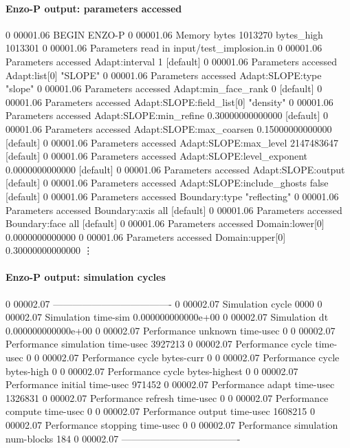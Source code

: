 \begin{frame}[fragile]
\secframetitle{\ssRunning}
\framesubtitle{Enzo-P output: parameters accessed}
\tiny
\begin{semiverbatim}
0 00001.06  BEGIN ENZO-P
0 00001.06 Memory bytes 1013270 bytes_high 1013301
0 00001.06 Parameters read in input/test_implosion.in
0 00001.06 Parameters accessed Adapt:interval 1 [default]
0 00001.06 Parameters accessed Adapt:list[0] "SLOPE"
0 00001.06 Parameters accessed Adapt:SLOPE:type "slope"
0 00001.06 Parameters accessed Adapt:min_face_rank 0 [default]
0 00001.06 Parameters accessed Adapt:SLOPE:field_list[0] "density"
0 00001.06 Parameters accessed Adapt:SLOPE:min_refine 0.30000000000000 [default]
0 00001.06 Parameters accessed Adapt:SLOPE:max_coarsen 0.15000000000000 [default]
0 00001.06 Parameters accessed Adapt:SLOPE:max_level 2147483647 [default]
0 00001.06 Parameters accessed Adapt:SLOPE:level_exponent 0.0000000000000 [default]
0 00001.06 Parameters accessed Adapt:SLOPE:output  [default]
0 00001.06 Parameters accessed Adapt:SLOPE:include_ghosts false [default]
0 00001.06 Parameters accessed Boundary:type "reflecting"
0 00001.06 Parameters accessed Boundary:axis all [default]
0 00001.06 Parameters accessed Boundary:face all [default]
0 00001.06 Parameters accessed Domain:lower[0] 0.0000000000000
0 00001.06 Parameters accessed Domain:upper[0] 0.30000000000000
\vdots
\end{semiverbatim}
\end{frame}
\begin{frame}[fragile]
\secframetitle{\ssRunning}
\framesubtitle{Enzo-P output: simulation cycles}
\tiny
\begin{semiverbatim}
0 00002.07  -------------------------------------
0 00002.07 Simulation cycle 0000
0 00002.07 Simulation time-sim 0.000000000000e+00
0 00002.07 Simulation dt 0.000000000000e+00
0 00002.07 Performance unknown time-usec 0
0 00002.07 Performance simulation time-usec 3927213
0 00002.07 Performance cycle time-usec 0
0 00002.07 Performance cycle bytes-curr 0
0 00002.07 Performance cycle bytes-high 0
0 00002.07 Performance cycle bytes-highest 0
0 00002.07 Performance initial time-usec 971452
0 00002.07 Performance adapt time-usec 1326831
0 00002.07 Performance refresh time-usec 0
0 00002.07 Performance compute time-usec 0
0 00002.07 Performance output time-usec 1608215
0 00002.07 Performance stopping time-usec 0
0 00002.07 Performance simulation num-blocks 184
0 00002.07  -------------------------------------
\end{semiverbatim}
\end{frame}


\begin{frame}[fragile]
\secframetitle{\ssRunning}
\begin{minipage}{2.5in}
\end{minipage}
\end{frame}

